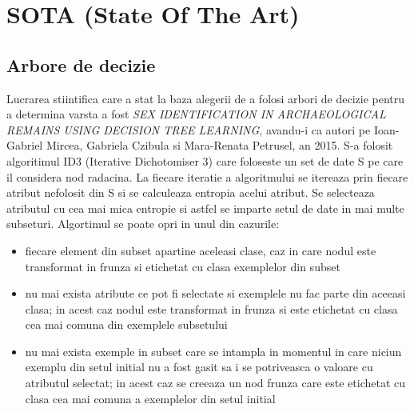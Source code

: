 \documentclass[runningheads,a4paper,11pt]{report}
\begin{document}
\chapter{SOTA (State Of The Art)}
\label{chapter:sota}

\section{Arbore de decizie}
\label{sotaArboreDecizie}
Lucrarea stiintifica care a stat la baza alegerii de a folosi arbori de decizie pentru a determina varsta a fost \textit{SEX IDENTIFICATION IN ARCHAEOLOGICAL REMAINS USING DECISION TREE LEARNING}, avandu-i ca autori pe Ioan-Gabriel Mircea, Gabriela Czibula si Mara-Renata Petrusel, an 2015. \newline \newline
S-a folosit algoritimul ID3 (Iterative Dichotomiser 3) care foloseste un set de date S pe care il considera nod radacina. La fiecare iteratie a algoritmului se itereaza prin fiecare atribut nefolosit din S si se calculeaza entropia acelui atribut. Se selecteaza atributul cu cea mai mica entropie si astfel se imparte setul de date in mai multe subseturi. Algortimul se poate opri in unul din cazurile:
\begin{itemize}
  \item fiecare element din subset apartine aceleasi clase, caz in care nodul este transformat in frunza si etichetat cu clasa exemplelor din subset
  \item nu mai exista atribute ce pot fi selectate si exemplele nu fac parte din aceeasi clasa; in acest caz nodul este transformat in frunza si este etichetat cu clasa cea mai comuna din exemplele subsetului
  \item nu mai exista exemple in subset care se intampla in momentul in care niciun exemplu din setul initial nu a fost gasit sa i se potriveasca o valoare cu atributul selectat; in acest caz se creeaza un nod frunza care este etichetat cu clasa cea mai comuna a exemplelor din setul initial
\end{itemize}
\end{document}
